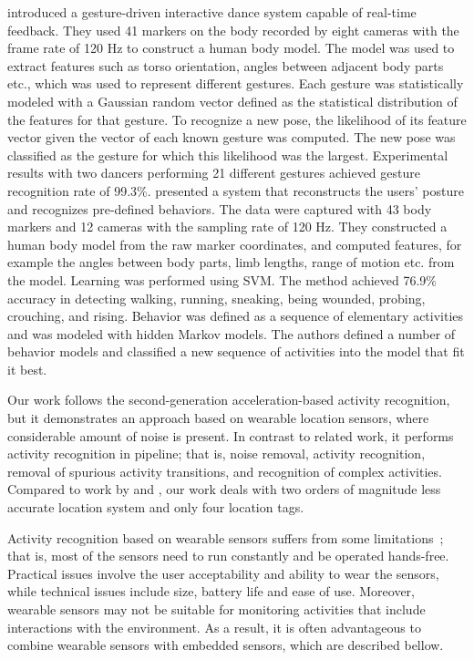 \cite{Qian2004} introduced a gesture-driven interactive dance system capable of real-time feedback. They used 41 markers on the body recorded by eight cameras with the frame rate of 120 Hz to construct a human body model. The model was used to extract features such as torso orientation, angles between adjacent body parts etc., which was used to represent different gestures. Each gesture was statistically modeled with a Gaussian random vector defined as the statistical distribution of the features for that gesture. To recognize a new pose, the likelihood of its feature vector given the vector of each known gesture was computed. The new pose was classified as the gesture for which this likelihood was the largest. Experimental results with two dancers performing 21 different gestures achieved gesture recognition rate of 99.3\%. \cite{Sukthankar2005} presented a system that reconstructs the users’ posture and recognizes pre-defined behaviors. The data were captured with 43 body markers and 12 cameras with the sampling rate of 120 Hz. They constructed a human body model from the raw marker coordinates, and computed features, for example the angles between body parts, limb lengths, range of motion etc. from the model. Learning was performed using SVM. The method achieved 76.9\% accuracy in detecting walking, running, sneaking, being wounded, probing, crouching, and rising. Behavior was defined as a sequence of elementary activities and was modeled with hidden Markov models. The authors defined a number of behavior models and classified a new sequence of activities into the model that fit it best.

Our work follows the second-generation acceleration-based activity recognition, but it demonstrates an approach based on wearable location sensors, where considerable amount of noise is present. In contrast to related work, it performs activity recognition in pipeline; that is, noise removal, activity recognition, removal of spurious activity transitions, and recognition of complex activities. Compared to work by \cite{Sukthankar2005} and \cite{Qian2004}, our work deals with two orders of magnitude less accurate location system and only four location tags.

Activity recognition based on wearable sensors suffers from some limitations~\citep{Chen2012}; that is, most of the sensors need to run constantly and be operated hands-free. Practical issues involve the user acceptability and ability to wear the sensors, while technical issues include size, battery life and ease of use. Moreover, wearable sensors may not be suitable for monitoring activities that include interactions with the environment. As a result, it is often advantageous to combine wearable sensors with embedded sensors, which are described bellow.



